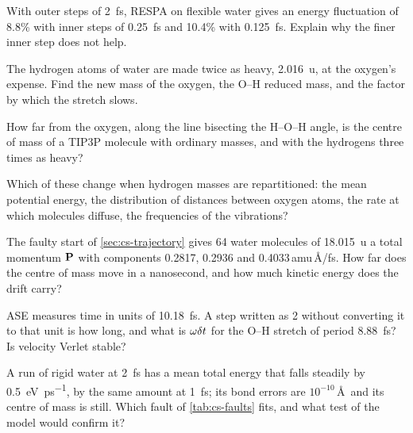 \begin{exercise}
\label{ex:cs-inner}
With outer steps of \SI{2}{\femto\second}, RESPA on flexible water gives
an energy fluctuation of 8.8\% with inner steps of
\SI{0.25}{\femto\second} and 10.4\% with \SI{0.125}{\femto\second}.
Explain why the finer inner step does not help.
\end{exercise}

\begin{exercise}
\label{ex:cs-hmr-double}
The hydrogen atoms of water are made twice as heavy, \SI{2.016}{\amu},
at the oxygen's expense. Find the new mass of the oxygen, the O--H
reduced mass, and the factor by which the stretch slows.
\end{exercise}

\begin{exercise}
\label{ex:cs-hmr-centre}
How far from the oxygen, along the line bisecting the H--O--H angle, is
the centre of mass of a TIP3P molecule with ordinary masses, and with the
hydrogens three times as heavy?
\end{exercise}

\begin{exercise}
\label{ex:cs-hmr-what}
Which of these change when hydrogen masses are repartitioned: the mean
potential energy, the distribution of distances between oxygen atoms, the
rate at which molecules diffuse, the frequencies of the vibrations?
\end{exercise}

\begin{exercise}
\label{ex:cs-drift}
The faulty start of \cref{sec:cs-trajectory} gives 64 water molecules
of \SI{18.015}{\amu} a total momentum $\bm{\mathrm{P}}$ with components 0.2817,
0.2936 and 0.4033\,amu\,\AA/fs. How far does the centre of mass move in a nanosecond,
and how much kinetic energy does the drift carry?
\end{exercise}

\begin{exercise}
\label{ex:cs-ase-step}
ASE measures time in units of \SI{10.18}{\femto\second}. A step written
as 2 without converting it to that unit is how long, and what is $\omega
\delta t$ for the O--H stretch of period \SI{8.88}{\femto\second}? Is velocity
Verlet stable?
\end{exercise}

\begin{exercise}
\label{ex:cs-diagnose}
A run of rigid water at \SI{2}{\femto\second} has a mean total energy that
falls steadily by \SI{0.5}{\electronvolt\per\pico\second}, by the same
amount at \SI{1}{\femto\second}; its bond errors are $10^{-10}$\,\AA\ and
its centre of mass is still. Which fault of \cref{tab:cs-faults} fits, and
what test of the model would confirm it?
\end{exercise}

